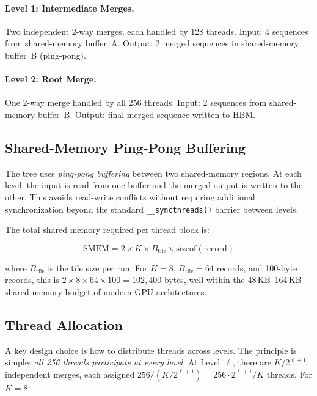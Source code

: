 \documentclass[conference,10pt]{IEEEtran}
\begin{document}
\paragraph{Level 1: Intermediate Merges.}
Two independent 2-way merges, each handled by 128 threads.  Input:
4 sequences from shared-memory buffer~A.  Output: 2 merged sequences in
shared-memory buffer~B (ping-pong).

\paragraph{Level 2: Root Merge.}
One 2-way merge handled by all 256 threads.  Input: 2 sequences from
shared-memory buffer~B.  Output: final merged sequence written to HBM.

\subsection{Shared-Memory Ping-Pong Buffering}
\label{sec:pingpong}

The tree uses \emph{ping-pong buffering} between two shared-memory regions.
At each level, the input is read from one buffer and the merged output is
written to the other.  This avoids read-write conflicts without requiring
additional synchronization beyond the standard \texttt{\_\_syncthreads()}
barrier between levels.

The total shared memory required per thread block is:

\begin{equation}
  \text{SMEM} = 2 \times K \times B_{\text{tile}} \times \text{sizeof}(\text{record})
  \label{eq:smem}
\end{equation}

\noindent where $B_{\text{tile}}$ is the tile size per run.  For $K{=}8$,
$B_{\text{tile}}{=}64$ records, and 100-byte records, this is
$2 \times 8 \times 64 \times 100 = 102{,}400$ bytes, well within the
48\,KB--164\,KB shared-memory budget of modern GPU architectures.

\subsection{Thread Allocation}

A key design choice is how to distribute threads across levels.
The principle is simple: \emph{all 256 threads participate at every level}.
At Level~$\ell$, there are $K/2^{\ell+1}$ independent merges, each assigned
$256 / (K/2^{\ell+1}) = 256 \cdot 2^{\ell+1} / K$ threads.  For $K{=}8$:
\end{document}
